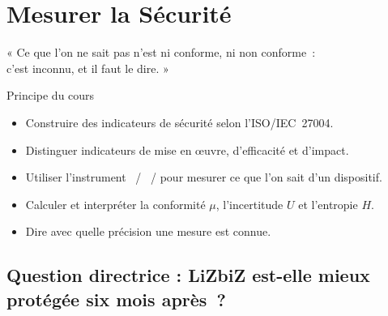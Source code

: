 
\chapter{Mesurer la Sécurité}
\label{chap:mesurer}

\epigraph{%
    « Ce que l'on ne sait pas n'est ni conforme, ni non conforme~:\\
    c'est inconnu, et il faut le dire. »%
}{Principe du cours}


\begin{boxobjectifs}
\begin{itemize}
    \item Construire des indicateurs de sécurité selon l'ISO/IEC~27004.
    \item Distinguer indicateurs de mise en œuvre, d'efficacité et
          d'impact.
    \item Utiliser l'instrument \OUI{}~/ \NON{}~/ \NEK{} pour mesurer ce
          que l'on sait d'un dispositif.
    \item Calculer et interpréter la conformité \(\mu\), l'incertitude
          \(U\) et l'entropie \(H\).
    \item Dire avec quelle précision une mesure est connue.
\end{itemize}
\end{boxobjectifs}

\bigskip

\section*{Question directrice : LiZbiZ est-elle mieux protégée six mois après~?}

